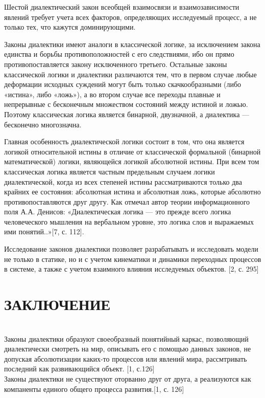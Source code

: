 \documentclass[a4paper,12pt]{report}
\begin{document}
     Шестой диалектический закон всеобщей взаимосвязи и взаимозависимости явлений требует учета всех факторов, определяющих исследуемый процесс, а не только тех, что кажутся доминирующими.
     
 Законы диалектики имеют аналоги в классической логике, за исключением закона единства и борьбы противоположностей с его следствиями, ибо он прямо противопоставляется закону исключенного третьего. Остальные законы классической логики и диалектики различаются тем, что в первом случае любые деформации исходных суждений могут быть только скачкообразными (либо «истина», либо «ложь»), а во втором случае все переходы плавные и непрерывные с бесконечным множеством состояний между истиной и ложью. Поэтому классическая логика является бинарной, двузначной, а диалектика — бесконечно многозначна. 
 
 Главная особенность диалектической логики состоит в том, что она является логикой относительной истины в отличие от классической формальной (бинарной математической) логики, являющейся логикой абсолютной истины. При всем том классическая логика является частным предельным случаем логики диалектической, когда из всех степеней истины рассматриваются только два крайних ее состояния: абсолютная истина и абсолютная ложь, которые абсолютно противопоставляются друг другу. Как отмечал автор теории информационного поля А.А. Денисов: «Диалектическая логика — это прежде всего логика человеческого мышления на вербальном уровне, это логика слов и выражаемых ими понятий..»[7, с. 112].
	
	Исследование законов диалектики позволяет разрабатывать и исследовать модели не только в статике, но и с учетом кинематики и динамики переходных процессов в системе, а также с учетом взаимного влияния исследуемых объектов. [2, с. 295]\\
	

\chapter*{ЗАКЛЮЧЕНИЕ }
 \\

Законы диалектики образуют своеобразный понятийный каркас, позволяющий диалектически смотреть на мир, описывать его с помощью данных законов, не допуская абсолютизации каких-то процессов или явлений мира, рассмтривать последний как развивающийся объект. [1, с.126]\\
Законы диалектики не существуют оторванно  друг от друга, а реализуются как компаненты единого общего процесса развития.[1, с. 126]
\end{document}

